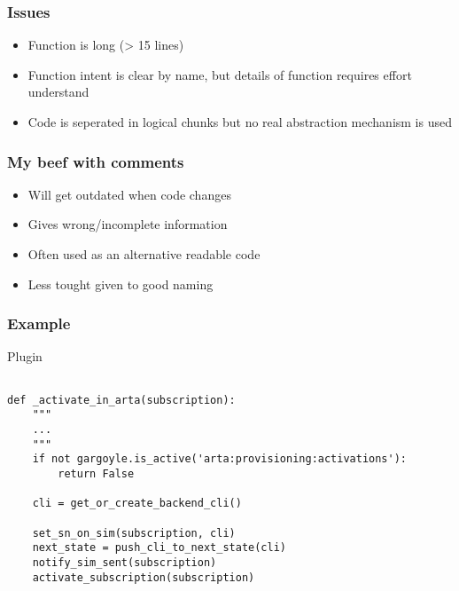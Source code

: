 \begin{frame}
    \frametitle{Issues}
    \begin{block}
        \begin{itemize}
            \item Function is long (> 15 lines)
            \item Function intent is clear by name, but details of function requires effort understand
            \item Code is seperated in logical chunks but no real abstraction mechanism is used
        \end{itemize}
    \end{block}

\end{frame}

\begin{frame}
    \frametitle{My beef with comments}
    \begin{block}
        \begin{itemize}
            \item Will get outdated when code changes
            \item Gives wrong/incomplete information
            \item Often used as an alternative readable code
            \item Less tought given to good naming
        \end{itemize}
    \end{block}
\end{frame}

\begin{frame}
    \frametitle{Example}
	\begin{block}{Plugin}
        \begin{lstlisting}

def _activate_in_arta(subscription):
    """
    ...
    """
    if not gargoyle.is_active('arta:provisioning:activations'):
        return False

    cli = get_or_create_backend_cli()

    set_sn_on_sim(subscription, cli)
    next_state = push_cli_to_next_state(cli)
    notify_sim_sent(subscription)
    activate_subscription(subscription)
        \end{lstlisting}
	\end{block}
\end{frame}

